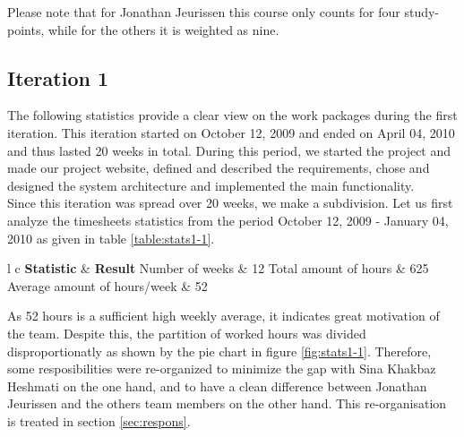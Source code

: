 \documentclass[salesmen, twoside]{../../../templates/latex/2009/softproj}
\begin{document}
\begin{projdoc}
			Please note that for Jonathan Jeurissen this course only counts for four study-points, while for the others 
			it is weighted as nine.
			
			\subsection{Iteration 1}
			
			The following statistics provide a clear view on the work packages during the first iteration. 
			This iteration started on October 12, 2009 and ended on April 04, 2010 and thus lasted 20 weeks in total. 
			During this period, we started the project and made our project website,
			defined and described the requirements, chose and designed the system architecture and 
			implemented the main functionality. \\
			
			Since this iteration was spread over 20 weeks, we make a subdivision. Let us first analyze 
			the timesheets statistics from the period October 12, 2009 - January 04, 2010 as given in
			table \ref{table:stats1-1}. \\
			
			\begin{table}
				\begin{center}
			\begin{tabular}{l c}
				\FL \textbf{Statistic} & \textbf{Result}
				\ML Number of weeks & 12
				\NN Total amount of hours  & 625
				\NN Average amount of hours/week & 52
			\end{tabular}
			\end{center}
			\caption{General statistics for period 12/10/09 - 04/01/10.}
			\label{table:stats1-1}
			\end{table}
			
			As 52 hours is a sufficient high weekly average, it indicates great motivation of the team.
			Despite this, the partition of worked hours was divided disproportionatly as shown by the pie chart in
			figure \ref{fig:stats1-1}. 
			Therefore, some resposibilities were re-organized to minimize the gap with Sina Khakbaz Heshmati
			on the one hand, 
			and to have a clean difference between Jonathan Jeurissen and the others team members on the other hand. 
			This re-organisation is treated in section \ref{sec:respons}. \\
			

\end{projdoc}
\end{document}
